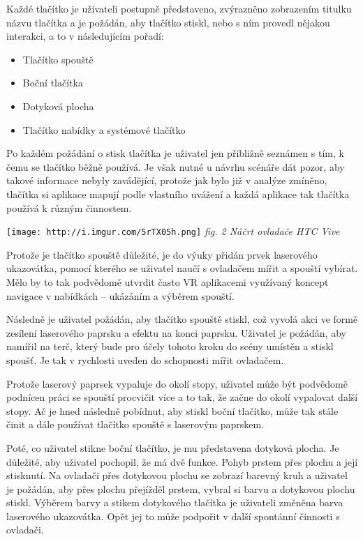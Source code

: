 Každé tlačítko je uživateli postupně představeno, zvýrazněno zobrazením
titulku názvu tlačítka a je požádán, aby tlačítko stiskl, nebo s ním
provedl nějakou interakci, a to v následujícím pořadí:

\begin{itemize}
\tightlist
\item
  Tlačítko spouště
\item
  Boční tlačítka
\item
  Dotyková plocha
\item
  Tlačítko nabídky a systémové tlačítko
\end{itemize}

Po každém požádání o stisk tlačítka je uživatel jen přibližně seznámen s
tím, k čemu se tlačítko běžně používá. Je však nutné u návrhu scénáře
dát pozor, aby takové informace nebyly zavádějící, protože jak bylo již
v analýze zmíněno, tlačítka si aplikace mapují podle vlastního uvážení
a každá aplikace tak tlačítka používá k různým činnostem.

\texttt{[image: http://i.imgur.com/5rTX05h.png]} \emph{fig. 2 Náčrt
ovladače HTC Vive}

Protože je tlačítko spouště důležité, je do výuky přidán prvek
laserového ukazovátka, pomocí kterého se uživatel naučí s ovladačem
mířit a spouští vybírat. Mělo by to tak podvědomě utvrdit často VR
aplikacemi využívaný koncept navigace v nabídkách -- ukázáním a výběrem
spouští.

Následně je uživatel požádán, aby tlačítko spouště stiskl, což vyvolá
akci ve formě zesílení laserového paprsku a efektu na konci paprsku.
Uživatel je požádán, aby namířil na terč, který bude pro účely tohoto
kroku do scény umístěn a stiskl spoušť. Je tak v rychlosti uveden do
schopnosti mířit ovladačem.

Protože laserový paprsek vypaluje do okolí stopy, uživatel může být
podvědomě podnícen práci se spouští procvičit více a to tak, že začne do
okolí vypalovat další stopy. Ač je hned následně pobídnut, aby stiskl
boční tlačítko, může tak stále činit a dále používat tlačítko spouště s
laserovým paprskem.

Poté, co uživatel stikne boční tlačítko, je mu představena dotyková
plocha. Je důležité, aby uživatel pochopil, že má dvě funkce. Pohyb
prstem přes plochu a její stisknutí. Na ovladači přes dotykovou plochu
se zobrazí barevný kruh a uživatel je požádán, aby přes plochu přejížděl
prstem, vybral si barvu a dotykovou plochu stiskl. Výběrem barvy a
stikem dotykového tlačítka je uživateli změněna barva laserového
ukazovátka. Opět jej to může podpořit v další spontánní činnosti s
ovladači.

